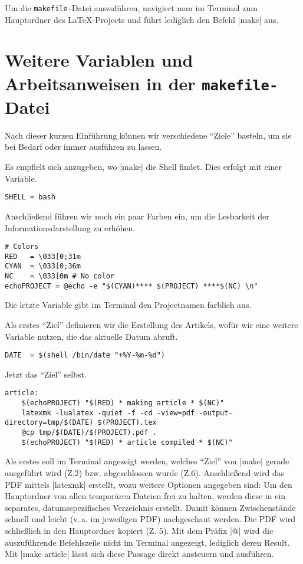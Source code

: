 \documentclass[ngerman]{dtk}
\begin{document}
Um die \texttt{makefile-}Datei auszuführen,
navigiert man im Terminal zum Hauptordner des \LaTeX -Projects
und führt lediglich den Befehl |make| aus.


\section{Weitere Variablen und Arbeitsanweisen in der \texttt{makefile-}Datei}
Nach dieser kurzen Einführung können wir verschiedene \enquote{Ziele}
basteln, um sie bei Bedarf oder immer ausführen zu lassen.

Es empfielt sich anzugeben, wo |make| die Shell findet.
Dies erfolgt mit einer Variable.
\begin{lstlisting}[style=number]
SHELL = bash
\end{lstlisting}

Anschließend führen wir noch ein paar Farben ein,
um die Lesbarkeit der Informationsdarstellung zu erhöhen.
\begin{lstlisting}[style=number]
# Colors
RED   = \033[0;31m
CYAN  = \033[0;36m
NC    = \033[0m # No color
echoPROJECT = @echo -e "$(CYAN)**** $(PROJECT) ****$(NC) \n"
\end{lstlisting}
Die letzte Variable gibt im Terminal den Projectnamen farblich aus.

Als erstes \enquote{Ziel} definieren wir die Erstellung des Artikels,
wofür wir eine weitere Variable nutzen, die das aktuelle Datum abruft.
\begin{lstlisting}[style=number]
DATE  = $(shell /bin/date "+%Y-%m-%d")
\end{lstlisting}

Jetzt das \enquote{Ziel} selbst.
\begin{lstlisting}[style=number]
article:
	$(echoPROJECT) "$(RED) * making article * $(NC)"
	latexmk -lualatex -quiet -f -cd -view=pdf -output-directory=tmp/$(DATE) $(PROJECT).tex
	@cp tmp/$(DATE)/$(PROJECT).pdf .
	$(echoPROJECT) "$(RED) * article compiled * $(NC)"
\end{lstlisting}
Als erstes soll im Terminal angezeigt werden, welches \enquote{Ziel}
von |make| gerade ausgeführt  wird (Z.2) bzw. abgeschlossen wurde (Z.6).
Anschließend wird das PDF mittels |latexmk| erstellt, wozu weitere Optionen angegeben sind:
Um den Hauptordner von allen temporären Dateien frei zu halten,
werden diese in ein separates, datumsspezifisches Verzeichnis erstellt.
Damit können Zwischenstände schnell und leicht (v.\,a. im jeweiligen PDF) nachgeschaut
werden.
Die PDF wird schließlich in den Hauptordner kopiert (Z. 5).
Mit dem Präfix |@| wird die auszuführende Befehlszeile nicht
im Terminal angezeigt, lediglich deren Result.
Mit |make article| lässt sich diese Passage direkt ansteuern und ausführen.
\end{document}
